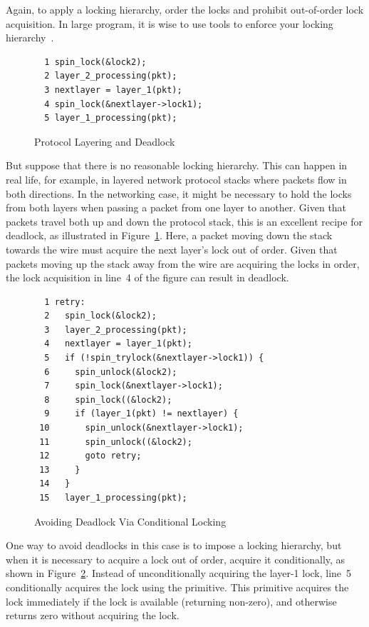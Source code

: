 Again, to apply a locking hierarchy, order the locks and prohibit
out-of-order lock acquisition.
In large program, it is wise to use tools to enforce your locking
hierarchy~\cite{JonathanCorbet2006lockdep}.

\begin{figure}[tbp]
{ \scriptsize
\begin{verbatim}
  1 spin_lock(&lock2);
  2 layer_2_processing(pkt);
  3 nextlayer = layer_1(pkt);
  4 spin_lock(&nextlayer->lock1);
  5 layer_1_processing(pkt);
\end{verbatim}
}
\caption{Protocol Layering and Deadlock}
\label{fig:locking:Protocol Layering and Deadlock}
\end{figure}

But suppose that there is no reasonable locking hierarchy.
This can happen in real life, for example, in layered network protocol stacks
where packets flow in both directions.
In the networking case, it might be necessary to hold the locks from
both layers when passing a packet from one layer to another.
Given that packets travel both up and down the protocol stack, this
is an excellent recipe for deadlock, as illustrated in
Figure~\ref{fig:locking:Protocol Layering and Deadlock}.
Here, a packet moving down the stack towards the wire must acquire
the next layer's lock out of order.
Given that packets moving up the stack away from the wire are acquiring
the locks in order, the lock acquisition in line~4 of the figure
can result in deadlock.

\begin{figure}[tbp]
{ \scriptsize
\begin{verbatim}
  1 retry:
  2   spin_lock(&lock2);
  3   layer_2_processing(pkt);
  4   nextlayer = layer_1(pkt);
  5   if (!spin_trylock(&nextlayer->lock1)) {
  6     spin_unlock(&lock2);
  7     spin_lock(&nextlayer->lock1);
  8     spin_lock((&lock2);
  9     if (layer_1(pkt) != nextlayer) {
 10       spin_unlock(&nextlayer->lock1);
 11       spin_unlock((&lock2);
 12       goto retry;
 13     }
 14   }
 15   layer_1_processing(pkt);
\end{verbatim}
}
\caption{Avoiding Deadlock Via Conditional Locking}
\label{fig:locking:Avoiding Deadlock Via Conditional Locking}
\end{figure}

One way to avoid deadlocks in this case is to impose a locking hierarchy,
but when it is necessary to acquire a lock out of order, acquire it
conditionally, as shown in
Figure~\ref{fig:locking:Avoiding Deadlock Via Conditional Locking}.
Instead of unconditionally acquiring the layer-1 lock, line~5
conditionally acquires the lock using the  primitive.
This primitive acquires the lock immediately if the lock is available
(returning non-zero), and otherwise returns zero without acquiring the lock.

